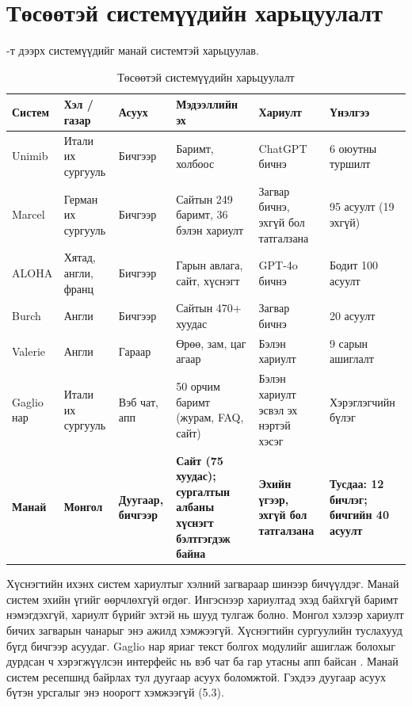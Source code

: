 \section{Төсөөтэй системүүдийн харьцуулалт}
\label{sec:lit-compare}

-т дээрх системүүдийг манай системтэй харьцуулав.

\begin{table}[H]
\centering
\caption{Төсөөтэй системүүдийн харьцуулалт}
\label{tab:similar_systems}
\small
\begin{tabular}{|p{2.2cm}|p{1.7cm}|p{1.6cm}|p{3.2cm}|p{2.4cm}|p{3.0cm}|}
\hline
\textbf{Систем} & \textbf{Хэл / газар} & \textbf{Асуух} & \textbf{Мэдээллийн эх} & \textbf{Хариулт} & \textbf{Үнэлгээ} \\
\hline
Unimib \cite{antico2024unimib} & Итали их сургууль & Бичгээр & Баримт, холбоос & ChatGPT бичнэ & 6 оюутны туршилт \\
\hline
Marcel \cite{trienes2025marcel} & Герман их сургууль & Бичгээр & Сайтын 249 баримт, 36 бэлэн хариулт & Загвар бичнэ, эхгүй бол татгалзана & 95 асуулт (19 эхгүй) \\
\hline
ALOHA \cite{tao2025aloha} & Хятад, англи, франц & Бичгээр & Гарын авлага, сайт, хүснэгт & GPT-4o бичнэ & Бодит 100 асуулт \\
\hline
Burch \cite{matic2026burch} & Англи & Бичгээр & Сайтын 470+ хуудас & Загвар бичнэ & 20 асуулт \\
\hline
Valerie \cite{gockley2005valerie} & Англи & Гараар & Өрөө, зам, цаг агаар & Бэлэн хариулт & 9 сарын ашиглалт \\
\hline
Gaglio нар \cite{gaglio2019campus} & Итали их сургууль & Вэб чат, апп & 50 орчим баримт (журам, FAQ, сайт) & Бэлэн хариулт эсвэл эх нэртэй хэсэг & Хэрэглэгчийн бүлэг \\
\hline
\textbf{Манай} & \textbf{Монгол} & \textbf{Дуугаар, бичгээр} & \textbf{Сайт (75 хуудас); сургалтын албаны хүснэгт бэлтгэгдэж байна} & \textbf{Эхийн үгээр, эхгүй бол татгалзана} & \textbf{Тусдаа: 12 бичлэг; бичгийн 40 асуулт} \\
\hline
\end{tabular}
\end{table}

Хүснэгтийн ихэнх систем хариултыг хэлний загвараар шинээр бичүүлдэг. Манай систем эхийн үгийг өөрчлөхгүй өгдөг. Ингэснээр хариултад эхэд байхгүй баримт нэмэгдэхгүй, хариулт бүрийг эхтэй нь шууд тулгаж болно. Монгол хэлээр хариулт бичих загварын чанарыг энэ ажилд хэмжээгүй. Хүснэгтийн сургуулийн туслахууд бүгд бичгээр асуудаг. Gaglio нар яриаг текст болгох модулийг ашиглаж болохыг дурдсан ч хэрэгжүүлсэн интерфейс нь вэб чат ба гар утасны апп байсан \cite{gaglio2019campus}. Манай систем ресепшнд байрлах тул дуугаар асуух боломжтой. Гэхдээ дуугаар асуух бүтэн урсгалыг энэ ноорогт хэмжээгүй (5.3).

